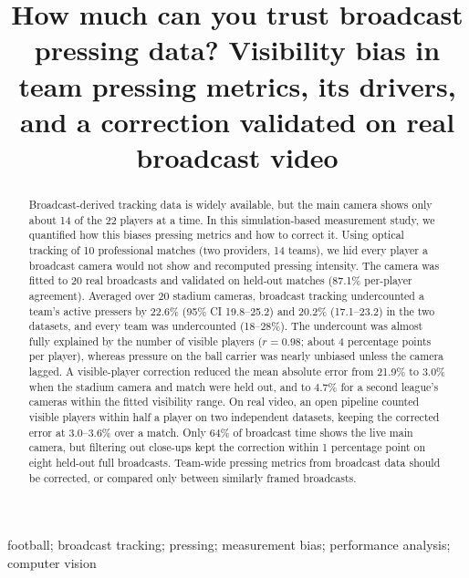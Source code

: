 \documentclass[]{interact}
\begin{document}

\title{How much can you trust broadcast pressing data? Visibility bias in team pressing metrics, its drivers, and a
correction validated on real broadcast video}

\author{
}

\maketitle

\begin{abstract}
Broadcast-derived tracking data is widely available, but the main camera shows only about 14 of the 22
players at a time. In this simulation-based measurement study, we quantified how this biases pressing metrics and how
to correct it. Using optical tracking of 10 professional matches (two providers, 14 teams), we hid every player a
broadcast camera would not show and recomputed pressing intensity. The camera was fitted to 20 real broadcasts and
validated on held-out matches (87.1\% per-player agreement). Averaged over 20 stadium cameras, broadcast tracking
undercounted a team's active pressers by 22.6\% (95\% CI 19.8--25.2) and 20.2\% (17.1--23.2) in the two datasets, and every team was undercounted (18--28\%). The undercount was almost fully explained by the number of
visible players ($r = 0.98$; about 4 percentage points per player), whereas pressure on the ball carrier was nearly
unbiased unless the camera lagged. A visible-player correction reduced the mean absolute
error from 21.9\% to 3.0\% when the stadium camera and match were held out, and to 4.7\% for a second league's cameras
within the fitted visibility range. On real video, an open pipeline counted visible players within half a player
on two independent datasets, keeping the corrected error at 3.0--3.6\% over a match. Only 64\%
of broadcast time shows the live main camera, but filtering out close-ups kept the correction within 1 percentage
point on eight held-out full broadcasts. Team-wide pressing metrics from
broadcast data should be corrected, or compared only between similarly framed broadcasts.
\end{abstract}

\begin{keywords}
football; broadcast tracking; pressing; measurement bias; performance analysis; computer vision
\end{keywords}
\end{document}
